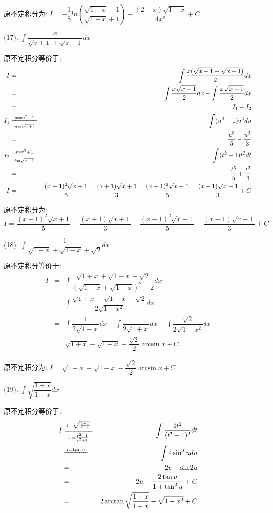 \begin{anymark}[积分训练]
\begin{solution}
		原不定积分为:  $I=-\dfrac{1}{8}ln\left(\dfrac{\sqrt{1-x}-1}{\sqrt{1-x}+1} \right)-\dfrac{(2-x)\sqrt{1-x}}{4x^2}+C$
	\end{solution}
	(17). $\int \dfrac{x}{\sqrt{x+1}+\sqrt{x-1}}dx$
	\begin{solution}
		
		原不定积分等价于:  
		\begin{eqnarray*}
			I&=&\int \dfrac{x(\sqrt{x+1}-\sqrt{x-1})}{2}dx\\
			&=&\int \dfrac{x\sqrt{x+1}}{2}dx-\int \dfrac{x\sqrt{x-1}}{2}dx\\
			&=&I_{1}-I_{2}\\
			I_{1}&\xlongequal[u=\sqrt{x+1}]{x=u^2-1}&\int (u^2-1)u^2du\\
			&=&\dfrac{u^5}{5}-\dfrac{u^3}{3}\\
			I_{2}&\xlongequal[t=\sqrt{x-1}]{x=t^2+1}&\int (t^2+1)t^2dt\\
			&=&\dfrac{t^5}{5}+\dfrac{t^3}{3}\\
			I&=&\dfrac{(x+1)^2\sqrt{x+1}}{5}-\dfrac{(x+1)\sqrt{x+1}}{3}-\dfrac{(x-1)^2\sqrt{x-1}}{5}-\dfrac{(x-1)\sqrt{x-1}}{3}+C
		\end{eqnarray*}
		
		原不定积分为:  $I=\dfrac{(x+1)^2\sqrt{x+1}}{5}-\dfrac{(x+1)\sqrt{x+1}}{3}-\dfrac{(x-1)^2\sqrt{x-1}}{5}-\dfrac{(x-1)\sqrt{x-1}}{3}+C$
	\end{solution}
	(18). $\int \dfrac{1}{\sqrt{1+x}+\sqrt{1-x}+\sqrt{2}}dx$
	\begin{solution}
		
		原不定积分等价于:  
		\begin{eqnarray*}
			I&=&\int \dfrac{\sqrt{1+x}+\sqrt{1-x}-\sqrt{2}}{(\sqrt{1+x}+\sqrt{1-x})^2-2}dx\\
			&=&\int \dfrac{\sqrt{1+x}+\sqrt{1-x}-\sqrt{2}}{2\sqrt{1-x^2}}dx\\
			&=&\int \dfrac{1}{2\sqrt{1-x}}dx+\int \dfrac{1}{2\sqrt{1+x}}dx-\int \dfrac{\sqrt{2}}{2\sqrt{1-x^2}}dx\\
			&=&\sqrt{1+x}-\sqrt{1-x}-\dfrac{\sqrt{2}}{2}\arcsin x+C
		\end{eqnarray*}
		
		原不定积分为:  $I=\sqrt{1+x}-\sqrt{1-x}-\dfrac{\sqrt{2}}{2}\arcsin x+C$
	\end{solution}
	(19). $\int \sqrt{\dfrac{1+x}{1-x}}dx$
	\begin{solution}
		
		原不定积分等价于:  
		\begin{eqnarray*}
			I&\xlongequal[x=\frac{t^2-1}{t^2+1}]{t=\sqrt{\frac{1+x}{1-x}}}&\int\dfrac{4t^2}{(t^2+1)^2}dt\\
			&\xlongequal{t=\tan u}&\int 4\sin^2 udu\\
			&=&2u-\sin2u\\
			&=&2u-\dfrac{2\tan u}{1+\tan^2 u}+C\\
			&=&2\arctan\sqrt{\dfrac{1+x}{1-x}}-\sqrt{1-x^2}+C
		\end{eqnarray*}
		

\end{solution}
\end{anymark}
